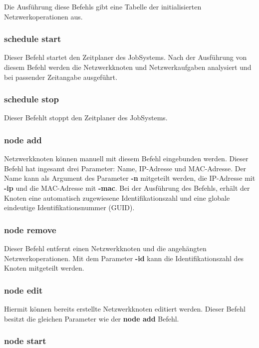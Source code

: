 \documentclass[12pt,a4paper]{report}
\begin{document}
\begin{onehalfspace}
Die Ausführung diese Befehls gibt eine Tabelle der initialisierten Netzwerkoperationen aus.

\subsubsection{schedule start}

Dieser Befehl startet den Zeitplaner des JobSystems. Nach der Ausführung von diesem Befehl werden die Netzwerkknoten und Netzwerkaufgaben analysiert und bei passender Zeitangabe ausgeführt.

\subsubsection{schedule stop}

Dieser Befehlt stoppt den Zeitplaner des JobSystems.

\subsubsection{node add}

Netzwerkknoten können manuell mit diesem Befehl eingebunden werden. Dieser Befehl hat ingesamt drei Parameter: Name, IP-Adresse und MAC-Adresse. Der Name kann als Argument des Parameter \textbf{-n} mitgeteilt werden, die IP-Adresse mit \textbf{-ip} und die MAC-Adresse mit \textbf{-mac}. Bei der Ausführung des Befehls, erhält der Knoten eine automatisch zugewiesene Identifikationszahl und eine globale eindeutige Identifikationsnummer (GUID).

\subsubsection{node remove}

Dieser Befehl entfernt einen Netzwerkknoten und die angehängten Netzwerkoperationen. Mit dem Parameter \textbf{-id} kann die Identifikationszahl des Knoten mitgeteilt werden.

\subsubsection{node edit}

Hiermit können bereits erstellte Netzwerkknoten editiert werden. Dieser Befehl besitzt die gleichen Parameter wie der \textbf{node add} Befehl.

\subsubsection{node start}


\end{onehalfspace}
\end{document}
